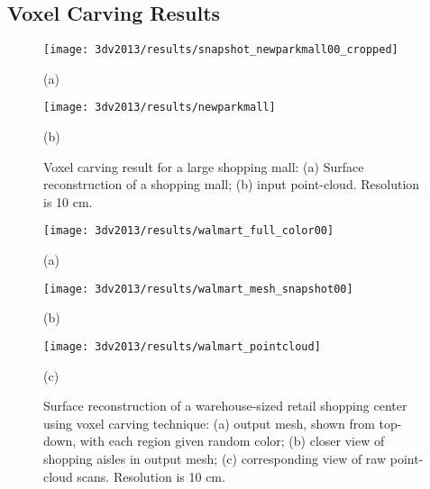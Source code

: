 \documentclass[12pt,onecolumn,oneside]{book}
\begin{document}
\subsection{Voxel Carving Results}
\label{ssec:3dv2013_results}


\begin{figure}
	\begin{minipage}[t]{0.4\linewidth}
	\centerline{\texttt{[image: 3dv2013/results/snapshot\_newparkmall00\_cropped]}}
	\centerline{(a)}
	\end{minipage}
	\hfill
	\begin{minipage}[t]{0.55\linewidth}
	\centerline{\texttt{[image: 3dv2013/results/newparkmall]}}
	\centerline{(b)}
	\end{minipage}
	\caption[Voxel carving result for a large shopping mall.]{Voxel carving result for a large shopping mall:  (a) Surface reconstruction of a shopping mall; (b) input point-cloud.  Resolution is 10 cm.}
	\label{fig:3dv2013_newparkmall}
\end{figure}

\begin{figure}[p]
	\begin{minipage}[b]{0.98\linewidth}
	\centerline{\texttt{[image: 3dv2013/results/walmart\_full\_color00]}}
	\centerline{(a)}
	\end{minipage}
	\begin{minipage}[b]{0.48\linewidth}
	\centerline{\texttt{[image: 3dv2013/results/walmart\_mesh\_snapshot00]}}
	\centerline{(b)}
	\end{minipage}
	\hfill
	\begin{minipage}[b]{0.48\linewidth}
	\centerline{\texttt{[image: 3dv2013/results/walmart\_pointcloud]}}
	\centerline{(c)}
	\end{minipage}
	\caption[Voxel carving of warehouse-sized retail center.]{Surface reconstruction of a warehouse-sized retail shopping center using voxel carving technique: (a) output mesh, shown from top-down, with each region given random color; (b) closer view of shopping aisles in output mesh; (c) corresponding view of raw point-cloud scans.  Resolution is 10 cm.}
	\label{fig:3dv2013_walmart}
\end{figure}
\end{document}
